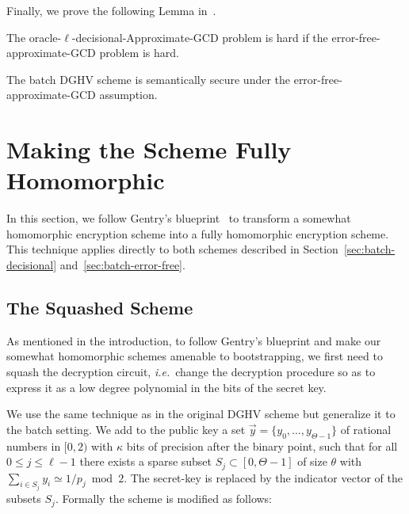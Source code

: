 \documentclass{llncs}
\newcommand{\ie}{\textsl{i.e.}\xspace}
\renewcommand\leq\leqslant
\begin{document}
Finally, we prove the following Lemma in~\cite[Appendix~C]{CLT2013a}.

\begin{lemma}
\label{l:redsec}
The oracle-$\ell$-decisional-Approximate-GCD problem is hard if the
error-free-approximate-GCD problem is hard.
\end{lemma}

\begin{corollary}
The batch DGHV scheme is semantically secure under the
error-free-approximate-GCD assumption.
\end{corollary}


\section{Making the Scheme Fully Homomorphic}

In this section, we follow Gentry's blueprint~\cite{GenPhD} to
transform a somewhat homomorphic encryption scheme into a fully
homomorphic encryption scheme. This technique applies directly to 
both schemes described in Section~\ref{sec:batch-decisional} 
and~\ref{sec:batch-error-free}.

\subsection{The Squashed Scheme}\label{subsec:squashing}

As mentioned in the introduction, to follow Gentry's blueprint and make
our somewhat homomorphic schemes amenable to bootstrapping, we first need
to squash the decryption circuit, \ie~change the decryption procedure
so as to express it as a low degree polynomial in the bits of the secret
key.

We use the same technique as in the original DGHV scheme
\cite{vDGHV2010} but generalize it to 
the batch setting. We add to the public key a set  $\vec y=\{ y_0,
\ldots, y_{\Theta-1} \}$ of rational numbers in $[0, 2)$ with $\kappa$
  bits of precision after the binary point, such that for all  $0 \leq
  j \leq \ell-1$ there exists a sparse subset $S_j \subset
  [0,\Theta-1]$ of size $\theta$ with $\sum_{i\in S_j}y_i\simeq
  1/p_j\bmod 2$.
The secret-key is replaced by the indicator vector of the subsets
$S_j$. Formally the scheme is modified as follows:
\end{document}
